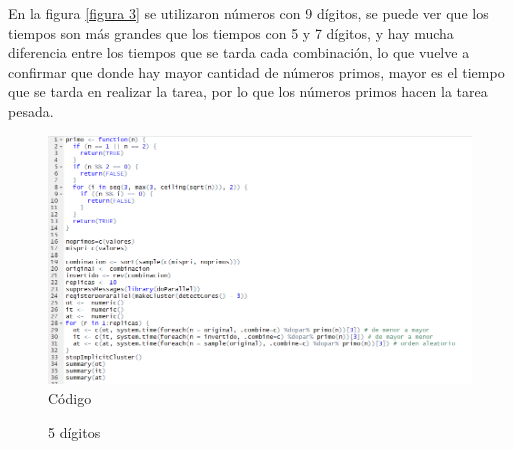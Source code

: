 \documentclass{article}
\begin{document}
En la figura \ref{figura 3} se utilizaron números con 9 dígitos, se puede ver que los tiempos son más grandes que los tiempos con 5 y 7 dígitos, y hay mucha diferencia entre los tiempos que se tarda cada combinación, lo que vuelve a confirmar que donde hay mayor cantidad de números primos, mayor es el tiempo que se tarda en realizar la tarea, por lo que los números primos hacen la tarea pesada. 


\begin{figure}
\centering\includegraphics[width=120mm]{codigo.png}
\caption{Código}
\label{codigo}
\end{figure}

\begin{figure}[htbp]
\centering
{}
\caption{5 dígitos} \label{figura 1}
\end{figure}
\end{document}
